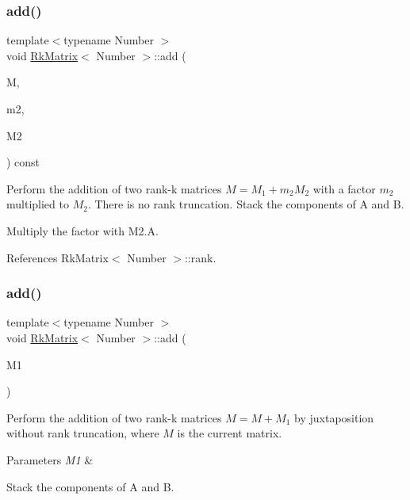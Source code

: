 \mbox{\label{classRkMatrix_a99413509ad44b1529f20cb018ce0fc70}} 
\subsubsection{\texorpdfstring{add()}{add()}\hspace{0.1cm}{\footnotesize\ttfamily [2/12]}}
{\footnotesize\ttfamily template$<$typename Number $>$ \\
void \hyperlink{classRkMatrix}{Rk\+Matrix}$<$ Number $>$\+::add (\begin{DoxyParamCaption}\item[{\hyperlink{classRkMatrix}{Rk\+Matrix}$<$ Number $>$ \&}]{M,  }\item[{const Number}]{m2,  }\item[{const \hyperlink{classRkMatrix}{Rk\+Matrix}$<$ Number $>$ \&}]{M2 }\end{DoxyParamCaption}) const}

Perform the addition of two rank-\/k matrices $M = M_1 + m_2 M_2$ with a factor $m_2$ multiplied to $M_2$. There is no rank truncation. Stack the components of {\ttfamily A} and {\ttfamily B}.

Multiply the factor with {\ttfamily M2.\+A}.

References Rk\+Matrix$<$ Number $>$\+::rank.

\mbox{\label{classRkMatrix_a8793188eb93def0030ae90e8f5898813}} 
\subsubsection{\texorpdfstring{add()}{add()}\hspace{0.1cm}{\footnotesize\ttfamily [3/12]}}
{\footnotesize\ttfamily template$<$typename Number $>$ \\
void \hyperlink{classRkMatrix}{Rk\+Matrix}$<$ Number $>$\+::add (\begin{DoxyParamCaption}\item[{const \hyperlink{classRkMatrix}{Rk\+Matrix}$<$ Number $>$ \&}]{M1 }\end{DoxyParamCaption})}

Perform the addition of two rank-\/k matrices $M = M + M_1$ by juxtaposition without rank truncation, where $M$ is the current matrix. 
\begin{DoxyParams}{Parameters}
{\em M1} & \\
\hline
\end{DoxyParams}
Stack the components of {\ttfamily A} and {\ttfamily B}.

